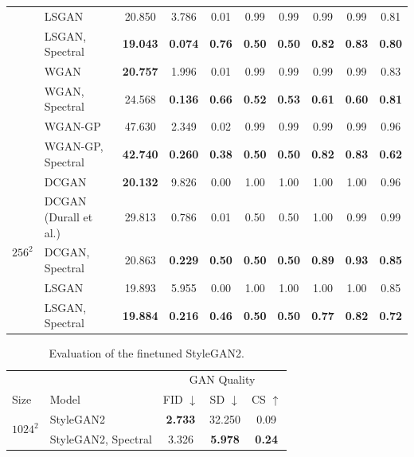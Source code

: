 \documentclass[letterpaper]{article} %
\begin{document}
\begin{table}
\begin{tabular}{l|l|ccc|ccccc}
 & LSGAN & 20.850 & 3.786 & 0.01  & 0.99 &0.99&0.99&0.99&0.81\\
 & LSGAN, Spectral & {\bf 19.043} & {\bf 0.074} & {\bf 0.76} &  {\bf 0.50}& {\bf 0.50} & {\bf 0.82}&{\bf 0.83}&{\bf 0.80}\\ %
 & WGAN & {\bf 20.757} & 1.996 & 0.01& 0.99 & 0.99 & 0.99&0.99 &0.83 \\
 & WGAN, Spectral & 24.568 & {\bf 0.136} & {\bf 0.66} & {\bf 0.52}& {\bf 0.53} &{\bf 0.61} &{\bf 0.60}&{\bf 0.81}\\ %
 & WGAN-GP & 47.630 & 2.349 & 0.02 &  0.99& 0.99 &   0.99& 0.99&0.96\\
 & WGAN-GP, Spectral & {\bf 42.740} & {\bf 0.260} & {\bf 0.38}  &  {\bf 0.50}&{\bf 0.50}& {\bf 0.82} & {\bf 0.83}&{\bf 0.62} \\\midrule
\multicolumn{1}{c|}{\multirow{5}{*}{$256^2$}} & DCGAN & {\bf 20.132} & 9.826 & 0.00 & 1.00 & 1.00 & 1.00 & 1.00 & 0.96\\
 & DCGAN (Durall et al.) & 29.813 & 0.786 & 0.01 & 0.50 & 0.50 & 1.00 & 0.99 & 0.99 \\
 & DCGAN, Spectral & 20.863 & {\bf 0.229} & {\bf 0.50}&{\bf 0.50}& {\bf 0.50} &  {\bf 0.89}&{\bf 0.93}&{\bf 0.85} \\ %
 & LSGAN & 19.893 & 5.955 & 0.00 & 1.00 & 1.00 & 1.00 & 1.00 & 0.85\\
 & LSGAN, Spectral & {\bf 19.884} & {\bf 0.216} & {\bf 0.46}  &{\bf 0.50} &{\bf 0.50}  & {\bf 0.77}&{\bf 0.82}&{\bf 0.72}\\
\bottomrule


    \end{tabular}
\end{table}

\begin{table}
    \caption{Evaluation of the finetuned StyleGAN2.}
    \label{tab1-stylegan}
    \small
    \centering
    \begin{tabular}{l|l|ccc}
        \toprule
        &&\multicolumn{3}{c}{GAN Quality}\\
        Size & Model & FID $\downarrow$ & SD $\downarrow$ & CS $\uparrow$ \\
        \midrule
            \multicolumn{1}{c|}{\multirow{2}{*}{$1024^2$}} & StyleGAN2 & {\bf 2.733} & 32.250 & 0.09 \\
            & StyleGAN2, Spectral & 3.326 & {\bf 5.978} & {\bf 0.24} \\
        \bottomrule
    \end{tabular}

\end{table}
\end{document}
